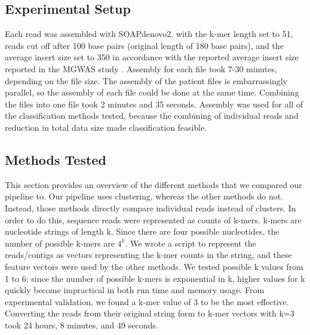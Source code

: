 
\subsection{Experimental Setup}

Each read was assembled with SOAPdenovo2, with the k-mer length set to 51, reads cut off after 100 base pairs (original length of 180 base pairs), and the average insert size set to 350 in accordance with the reported average insert size reported in the MGWAS study \cite{qin041012}. Assembly for each file took 7-30 minutes, depending on the file size. The assembly of the patient files is embarrassingly parallel, so the assembly of each file could be done at the same time. Combining the files into one file took 2 minutes and 35 seconds. Assembly was used for all of the classification methods tested, because the combining of individual reads and reduction in total data size made classification feasible.

\subsection{Methods Tested}

This section provides an overview of the different methods that we compared our pipeline to. Our pipeline uses clustering, whereas the other methods do not. Instead, those methods directly compare individual reads instead of clusters. In order to do this, sequence reads were represented as counts of k-mers. k-mers are nucleotide strings of 
length k. Since there are four possible nucleotides, the number
of possible k-mers are \(4^k\). 
We wrote a script to represent the reads/contigs as vectors representing the k-mer counts in the string, and these feature 
vectors were used by the other methods. We tested possible k values 
from 1 to 6; since the number of possible k-mers is 
exponential in k, higher values for k quickly become impractical in both run time and memory usage. From experimental validation, we found a k-mer value of 3 to be the most effective. Converting the reads from their original string form to k-mer vectors with k=3 took 24 hours, 8 minutes, and 49 seconds.


